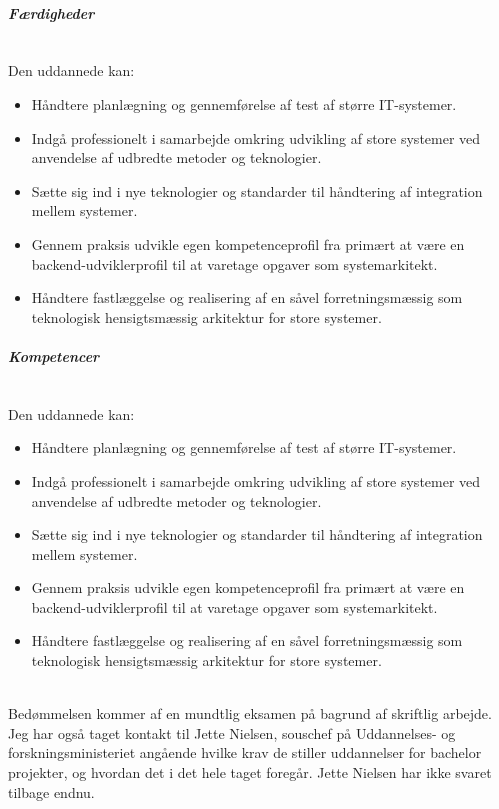 \documentclass[class=report, crop=false]{standalone}
\begin{document}
    \paragraph{\textit{Færdigheder}}\mbox{}\\
    Den uddannede kan:
    \begin{itemize}%
        \item Håndtere planlægning og gennemførelse af test af større IT-systemer.
        \item Indgå professionelt i samarbejde omkring udvikling af store systemer ved anvendelse af udbredte metoder og teknologier.
        \item Sætte sig ind i nye teknologier og standarder til håndtering af integration mellem systemer.
        \item Gennem praksis udvikle egen kompetenceprofil fra primært at være en backend-udviklerprofil til at varetage opgaver som systemarkitekt.
        \item Håndtere fastlæggelse og realisering af en såvel forretningsmæssig som teknologisk hensigtsmæssig arkitektur for store systemer.
    \end{itemize}
    \paragraph{\textit{Kompetencer}}\mbox{}\\
    Den uddannede kan:
    \begin{itemize}%
        \item Håndtere planlægning og gennemførelse af test af større IT-systemer.
        \item Indgå professionelt i samarbejde omkring udvikling af store systemer ved anvendelse af udbredte metoder og teknologier.
        \item Sætte sig ind i nye teknologier og standarder til håndtering af integration mellem systemer.
        \item Gennem praksis udvikle egen kompetenceprofil fra primært at være en backend-udviklerprofil til at varetage opgaver som systemarkitekt.
        \item Håndtere fastlæggelse og realisering af en såvel forretningsmæssig som teknologisk hensigtsmæssig arkitektur for store systemer.
    \end{itemize}

    \mbox{}\\ Bedømmelsen kommer af en mundtlig eksamen på bagrund af skriftlig arbejde. Jeg har også taget kontakt til Jette Nielsen, souschef på Uddannelses- og forskningsministeriet angående hvilke krav 
    de stiller uddannelser for bachelor projekter, og hvordan det i det hele taget foregår. 
    Jette Nielsen har ikke svaret tilbage endnu.
\end{document}
